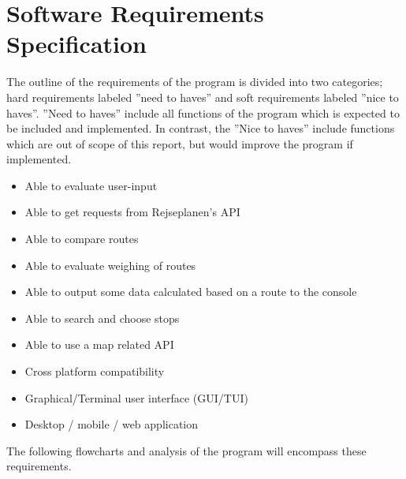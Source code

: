 \section{Software Requirements Specification}\label{sec:software-requirements-specification}

The outline of the requirements of the program is divided into two categories; hard requirements labeled ''need to
haves'' and soft requirements labeled ''nice to haves''.
''Need to haves'' include all functions of the program which is expected to be included and implemented.
In contrast, the ''Nice to haves'' include functions which are out of scope of this report, but would improve the
program if implemented.

\begin{itemize}[label=Need to haves]
    \item Able to evaluate user-input
    \item Able to get requests from Rejseplanen’s API
    \item Able to compare routes
    \item Able to evaluate weighing of routes
    \item Able to output some data calculated based on a route to the console
\end{itemize}

\begin{itemize}[label=Nice to haves]
    \item Able to search and choose stops
    \item Able to use a map related API
    \item Cross platform compatibility
    \item Graphical/Terminal user interface (GUI/TUI)
    \item Desktop / mobile / web application
\end{itemize}

The following flowcharts and analysis of the program will encompass these requirements.
